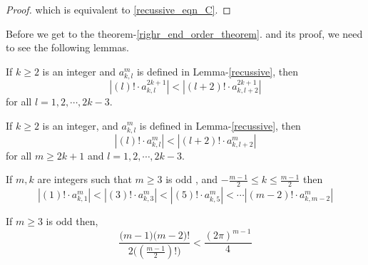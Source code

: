 \documentclass[../document.tex]{subfiles}
\begin{document}
\begin{appendices}
\begin{proof}
			which is equivalent to \eqref{recussive_eqn_C}.
		\end{proof}
		
		Before we get to the theorem-\ref{righr_end_order_theorem}.
		and its proof, we need to see the following lemmas.
		
		\begin{lemma} \label{A1}
			If $k \geq 2$ is an integer and $a^{m}_{k,l}$ is defined in Lemma-\eqref{recussive}, then
			\begin{equation} \label{127}
				|(l)!  \cdot  a^{2k+1}_{k,l}  | <
				|(l+2)! \cdot  a^{2k+1}_{k,l+2}  |
			\end{equation}
			for all $l=1,2,\cdots,2k-3$.
			
		\end{lemma}
		
		\begin{lemma} \label{A2}
			If $k \geq 2$ is an integer, and $a^{m}_{k,l}$ is defined in Lemma-\eqref{recussive}, then
			\begin{equation} \label{131}
				|(l)!  \cdot  a^{m}_{k,l}  | <
				|(l+2)! \cdot  a^{m}_{k,l+2}  |
			\end{equation}
			for all $m\geq2k+1$ and $l=1,2,\cdots,2k-3$.
		\end{lemma}	
		
		\begin{lemma} \label{A3}
			If $m,k$ are integers such that $m \geq 3$ is odd , and $-\frac{m-1}{2}\leq k \leq \frac{m-1}{2}$ then
			\begin{equation} \label{135}
				|(1)!\cdot a_{k,1}^{m}| <
				|(3)!\cdot a_{k,3}^{m}| <
				|(5)!\cdot a_{k,5}^{m}| <
				\cdots
				|(m-2)!\cdot a_{k,m-2}^{m}|
			\end{equation}
		\end{lemma}	
		
		\begin{lemma} \label{A4}
			If $m\geq3$ is odd then,
			\begin{equation} \label{136}
				\frac{\big( m-1 \big)\big( m-2 \big)!}{2\big( (\frac{m-1}{2})!\big)} <
				\frac{(2\pi)^{m-1}}{4}
			\end{equation}
		\end{lemma}	
		

\end{appendices}
\end{document}
